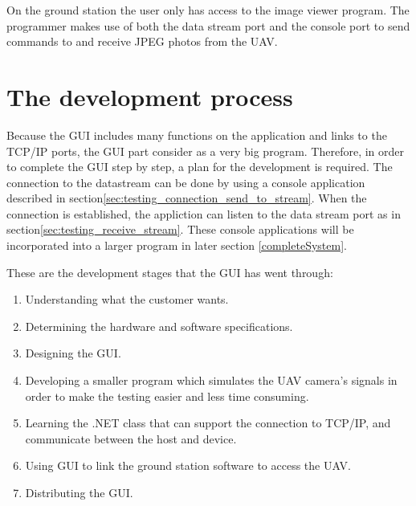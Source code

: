 \label{chap:implementation_ground_station }

On the ground station the user only has access to the image viewer program.
The programmer makes use of both the data stream port and the console port to send commands to and receive JPEG photos from the UAV.

\section{The development process} 
Because the GUI includes many functions on the application and links to the TCP/IP ports, the GUI part consider as a very big program. 
Therefore, in order to complete the GUI step by step, a plan for the development is required.
The connection to the datastream can be done by using a console application described in section\ref{sec:testing_connection_send_to_stream}.
When the connection is established, the appliction can listen to the data stream port as in section\ref{sec:testing_receive_stream}.
These console applications will be incorporated into a larger program in later section \ref{completeSystem}. 

These are the development stages that the GUI has went through:

\flushleft
\begin{enumerate}

\item	Understanding what the customer wants. 

\item	Determining the hardware and software specifications.
 
\item	Designing the GUI.

\item  Developing a smaller program which simulates the UAV camera's signals in order to make the testing easier and less time consuming. 

\item	Learning the .NET class that can support the connection to TCP/IP, and communicate between the host and device.

\item	Using GUI to link the ground station software to access the UAV.

\item	Distributing the GUI.
\end{enumerate}


